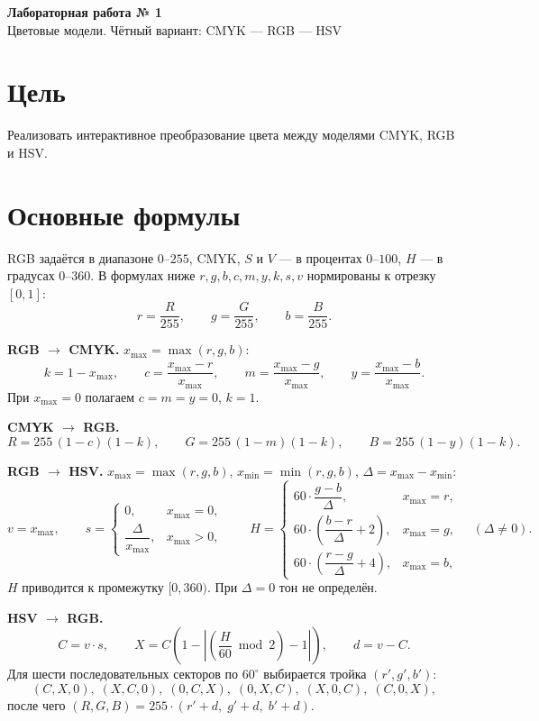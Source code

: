\documentclass[11pt,a4paper]{article}
\newcommand{\xmax}{x_{\max}}
\newcommand{\xmin}{x_{\min}}
\begin{document}
\begin{center}
  {\LARGE\bfseries Лабораторная работа № 1}\\[0.4em]
  {\large Цветовые модели. Чётный вариант: CMYK — RGB — HSV}
\end{center}

\section{Цель}
Реализовать интерактивное преобразование цвета между моделями CMYK, RGB и HSV.

\section{Основные формулы}
RGB задаётся в диапазоне $0\text{–}255$, CMYK, $S$ и $V$ — в процентах
$0\text{–}100$, $H$ — в градусах $0\text{–}360$. В формулах ниже
$r, g, b, c, m, y, k, s, v$ нормированы к отрезку $[0, 1]$:
\[
  r = \frac{R}{255}, \qquad g = \frac{G}{255}, \qquad b = \frac{B}{255}.
\]

\textbf{RGB $\to$ CMYK.} $\xmax = \max(r, g, b)$:
\[
  k = 1 - \xmax, \qquad
  c = \frac{\xmax - r}{\xmax}, \qquad
  m = \frac{\xmax - g}{\xmax}, \qquad
  y = \frac{\xmax - b}{\xmax}.
\]
При $\xmax = 0$ полагаем $c = m = y = 0$, $k = 1$.

\textbf{CMYK $\to$ RGB.}
\[
  R = 255\,(1 - c)(1 - k), \qquad
  G = 255\,(1 - m)(1 - k), \qquad
  B = 255\,(1 - y)(1 - k).
\]

\textbf{RGB $\to$ HSV.} $\xmax = \max(r, g, b)$, $\xmin = \min(r, g, b)$,
$\Delta = \xmax - \xmin$:
\[
  v = \xmax, \qquad
  s = \begin{cases} 0, & \xmax = 0,\\[2pt] \dfrac{\Delta}{\xmax}, & \xmax > 0, \end{cases}
  \qquad
  H = \begin{cases}
    60 \cdot \dfrac{g - b}{\Delta}, & \xmax = r,\\[8pt]
    60 \cdot \left(\dfrac{b - r}{\Delta} + 2\right), & \xmax = g,\\[8pt]
    60 \cdot \left(\dfrac{r - g}{\Delta} + 4\right), & \xmax = b,
  \end{cases}
  \quad (\Delta \neq 0).
\]
$H$ приводится к промежутку $[0, 360)$. При $\Delta = 0$ тон не определён.

\textbf{HSV $\to$ RGB.}
\[
  C = v \cdot s, \qquad
  X = C \left(1 - \left| \left(\frac{H}{60} \bmod 2\right) - 1 \right|\right), \qquad
  d = v - C.
\]
Для шести последовательных секторов по $60^\circ$ выбирается тройка $(r', g', b')$:
\[
  (C, X, 0),\; (X, C, 0),\; (0, C, X),\; (0, X, C),\; (X, 0, C),\; (C, 0, X),
\]
после чего $(R, G, B) = 255 \cdot (r' + d,\; g' + d,\; b' + d)$.
\end{document}
